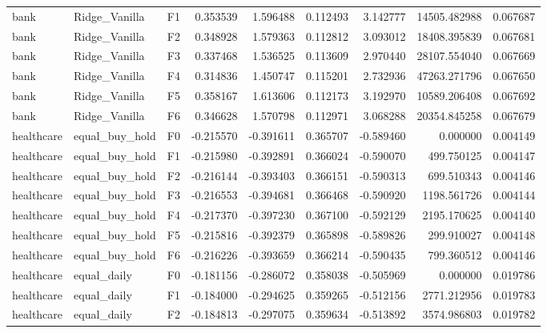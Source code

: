 \begin{tabular}{lllrrrrrr}
      bank &  Ridge\_Vanilla &  F1 &  0.353539 &  1.596488 & 0.112493 &  3.142777 &     14505.482988 &             0.067687 \\
      bank &  Ridge\_Vanilla &  F2 &  0.348928 &  1.579363 & 0.112812 &  3.093012 &     18408.395839 &             0.067681 \\
      bank &  Ridge\_Vanilla &  F3 &  0.337468 &  1.536525 & 0.113609 &  2.970440 &     28107.554040 &             0.067669 \\
      bank &  Ridge\_Vanilla &  F4 &  0.314836 &  1.450747 & 0.115201 &  2.732936 &     47263.271796 &             0.067650 \\
      bank &  Ridge\_Vanilla &  F5 &  0.358167 &  1.613606 & 0.112173 &  3.192970 &     10589.206408 &             0.067692 \\
      bank &  Ridge\_Vanilla &  F6 &  0.346628 &  1.570798 & 0.112971 &  3.068288 &     20354.845258 &             0.067679 \\
healthcare & equal\_buy\_hold &  F0 & -0.215570 & -0.391611 & 0.365707 & -0.589460 &         0.000000 &             0.004149 \\
healthcare & equal\_buy\_hold &  F1 & -0.215980 & -0.392891 & 0.366024 & -0.590070 &       499.750125 &             0.004147 \\
healthcare & equal\_buy\_hold &  F2 & -0.216144 & -0.393403 & 0.366151 & -0.590313 &       699.510343 &             0.004146 \\
healthcare & equal\_buy\_hold &  F3 & -0.216553 & -0.394681 & 0.366468 & -0.590920 &      1198.561726 &             0.004144 \\
healthcare & equal\_buy\_hold &  F4 & -0.217370 & -0.397230 & 0.367100 & -0.592129 &      2195.170625 &             0.004140 \\
healthcare & equal\_buy\_hold &  F5 & -0.215816 & -0.392379 & 0.365898 & -0.589826 &       299.910027 &             0.004148 \\
healthcare & equal\_buy\_hold &  F6 & -0.216226 & -0.393659 & 0.366214 & -0.590435 &       799.360512 &             0.004146 \\
healthcare &    equal\_daily &  F0 & -0.181156 & -0.286072 & 0.358038 & -0.505969 &         0.000000 &             0.019786 \\
healthcare &    equal\_daily &  F1 & -0.184000 & -0.294625 & 0.359265 & -0.512156 &      2771.212956 &             0.019783 \\
healthcare &    equal\_daily &  F2 & -0.184813 & -0.297075 & 0.359634 & -0.513892 &      3574.986803 &             0.019782 \\

\end{tabular}
